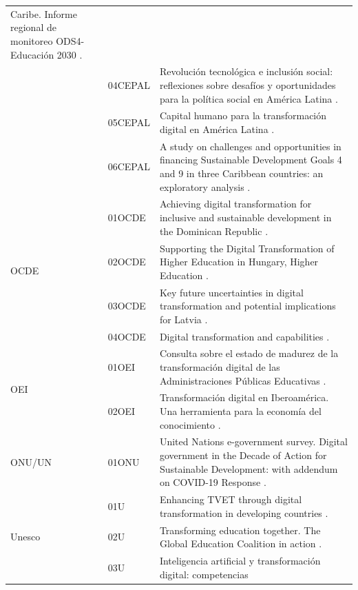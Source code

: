 \begin{table}[htpb]
\begin{tabular}{ll >{\raggedright\arraybackslash}p{}}
        Caribe. Informe regional de monitoreo ODS4-Educación 2030 \cite{unesco2022}. \\
        & 04CEPAL & Revolución tecnológica e inclusión social: reflexiones sobre
        desafíos y oportunidades para la política social en América Latina
        \cite{Velasquez2020Revolucion}. \\
        & 05CEPAL & Capital humano para la transformación digital en América
        Latina \cite{katz2018capital}. \\
        & 06CEPAL & A study on challenges and opportunities in financing
        Sustainable Development Goals 4 and 9 in three Caribbean countries: an
        exploratory analysis \cite{hendrickson2023study}. \\
        \multirow{4}{*}{OCDE} & 01OCDE & Achieving digital
        transformation for inclusive and sustainable development in the
        Dominican Republic \cite{OECD2022DominicanRepublic}. \\
        & 02OCDE & Supporting the Digital Transformation of Higher Education in
        Hungary, Higher Education \cite{OECD2021Hungary}. \\
        & 03OCDE & Key future uncertainties in digital transformation and
        potential implications for Latvia \cite{OECD2021Latvia}. \\
        & 04OCDE & Digital transformation and capabilities \cite{OECD2019Italy}. \\
        \multirow{2}{*}{OEI} & 01OEI & Consulta sobre el estado de
        madurez de la transformación digital de las Administraciones Públicas
        Educativas \cite{Mares2023Transformacion}. \\
        & 02OEI & Transformación digital en Iberoamérica. Una herramienta para
        la economía del conocimiento \cite{OEI2023TransformacionDigital}. \\
        ONU/UN & 01ONU & United Nations e-government survey. Digital
        government in the Decade of Action for Sustainable Development: with
        addendum on COVID-19 Response \cite{UN2020EGovernmentSurvey}. \\
        \multirow{5}{*}{Unesco} & 01U & Enhancing TVET through digital
        transformation in developing countries \cite{UNESCO2023EnhancingTVET}. \\
        & 02U & Transforming education together. The Global Education Coalition
        in action \cite{UNESCO2023TransformingEducation}. \\
        & 03U & Inteligencia artificial y transformación digital: competencias

\end{tabular}
\end{table}
